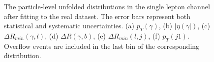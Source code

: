 \begin{figure}[ht]
  \quad\quad
  \quad\quad
  \caption{The particle-level unfolded distributions in the single lepton channel after fitting to the real dataset. 
  The error bars represent both statistical and systematic uncertainties. (a) $p_T(\gamma)$, (b) $|\eta(\gamma|)$, 
  (c) $\Delta R_{min}(\gamma, l)$, (d) $\Delta R(\gamma, b)$, (e) $\Delta R_{min}(l, j)$, (f) $p_T(j1)$. Overflow events are included in the last bin of the corresponding distribution.}
  \label{fig:pt_unfolded_ljet_dist_realdata}
\end{figure}
\FloatBarrier



